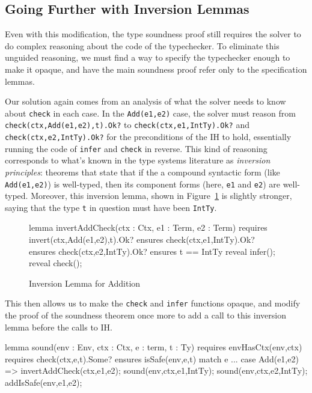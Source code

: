\documentclass[sigplan,review,screen,anonymous]{acmart}
\begin{document}
\subsection*{Going Further with Inversion Lemmas}

Even with this modification, the type soundness proof still requires the solver to
do complex reasoning about the code of the typechecker. To eliminate this unguided
reasoning, we must find a way to specify the typechecker enough to make it opaque,
and have the main soundness proof refer only to the specification lemmas.

Our solution again comes from an analysis of what the solver needs to know about
\texttt{check} in each case. In the \texttt{Add(e1,e2)} case, the solver must
reason from \texttt{check(ctx,Add(e1,e2),t).Ok?} to \texttt{check(ctx,e1,IntTy).Ok?} and
\texttt{check(ctx,e2,IntTy).Ok?} for the preconditions of the IH to hold, essentially
running the code of \texttt{infer} and \texttt{check} in reverse.  This kind of reasoning
corresponds to what's known in the type systems literature as \emph{inversion
principles}: theorems that state that if the a compound syntactic form (like
\texttt{Add(e1,e2)}) is well-typed, then its component forms (here, \texttt{e1}
and \texttt{e2}) are well-typed. Moreover, this inversion lemma, shown in Figure~\ref{fig:add-invert} is slightly stronger, saying that
the type \texttt{t} in question must have been \texttt{IntTy}.


\begin{figure}
\begin{dafny}
  lemma invertAddCheck(ctx : Ctx, e1 : Term, e2 : Term)
  requires invert(ctx,Add(e1,e2),t).Ok?
  ensures check(ctx,e1,IntTy).Ok?
  ensures check(ctx,e2,IntTy).Ok?
  ensures t == IntTy
{ reveal infer(); reveal check(); }
\end{dafny}

  \caption{Inversion Lemma for Addition}
  \label{fig:add-invert}
\end{figure}

This then allows us to make the \texttt{check} and \texttt{infer} functions opaque, and modify
the proof of the soundness theorem once more to add a call to this inversion lemma before the calls to IH.

\begin{dafny}
lemma sound(env : Env, ctx : Ctx, e : term, t : Ty)
  requires envHasCtx(env,ctx)
  requires check(ctx,e,t).Some?
  ensures isSafe(env,e,t)
{
  match e {
    ...
    case Add(e1,e2) =>
      invertAddCheck(ctx,e1,e2);
      sound(env,ctx,e1,IntTy);
      sound(env,ctx,e2,IntTy);
      addIsSafe(env,e1,e2);
  }
}
\end{dafny}
\end{document}
